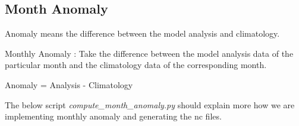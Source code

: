\documentclass[letterpaper,10pt,english]{sphinxmanual}
\begin{document}
\subsection{Month Anomaly}
\label{diagnosis:month-anomaly}
Anomaly means the difference between the model analysis and climatology.

Monthly Anomaly : Take the difference between the model analysis data of the particular month and the climatology data of the corresponding month.

Anomaly = Analysis - Climatology

The below script \emph{compute\_month\_anomaly.py} should explain more how we are implementing monthly anomaly and generating the nc files.
\label{diagnosis:module-compute_month_anomaly}\label{diagnosis:module-compute_month_anomaly.py}
\end{document}
